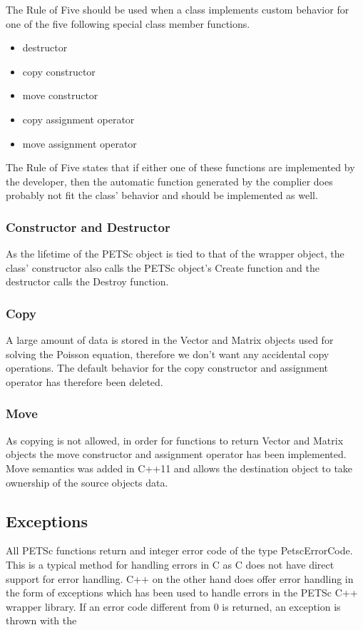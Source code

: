 The Rule of Five should be used when a class implements custom behavior for one
of the five following special class member functions.
\begin{itemize}
	\item destructor
	\item copy constructor
	\item move constructor
	\item copy assignment operator
	\item move assignment operator
\end{itemize}
The Rule of Five states that if either one of these functions are implemented by
the developer, then the automatic function generated by the complier does
probably not fit the class' behavior and should be implemented as well.

\subsubsection{Constructor and Destructor}

As the lifetime of the PETSc object is tied to that of the wrapper object,
the class' constructor also calls the PETSc object's Create function and the 
destructor calls the Destroy function. 

\subsubsection{Copy}

A large amount of data is stored in the Vector and Matrix objects used for solving the
Poisson equation, therefore we don't want any accidental copy operations.
The default behavior for the copy constructor and assignment operator has
therefore been deleted.

\subsubsection{Move}

As copying is not allowed, in order for functions to return Vector and Matrix
objects the move constructor and assignment operator has been implemented.
Move semantics was added in C++11 and allows the destination object to take
ownership of the source objects data.

\subsection{Exceptions}

All PETSc functions return and integer error code of the type PetscErrorCode.
This is a typical method for handling errors in C as C does not have direct
support for error handling. C++ on the other hand does offer error handling in
the form of exceptions which has been used to handle errors in the PETSc C++
wrapper library. If an error code different from 0 is returned, an exception
is thrown with the 

